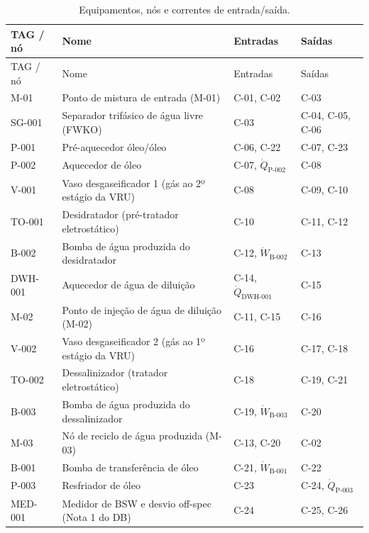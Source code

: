 \documentclass[11pt,a4paper]{article}
\numberwithin{equation}{section}
\numberwithin{table}{section}
\numberwithin{figure}{section}
\begin{document}
\begin{longtable}{lL{7cm}L{3cm}L{3.2cm}}
\caption{Equipamentos, nós e correntes de entrada/saída.}\label{tab:blocos}\\\toprule
TAG / nó & Nome & Entradas & Saídas\\\midrule\endfirsthead
\toprule TAG / nó & Nome & Entradas & Saídas\\\midrule\endhead

M-01 & Ponto de mistura de entrada (M-01) & C-01, C-02 & C-03\\
SG-001 & Separador trifásico de água livre (FWKO) & C-03 & C-04, C-05, C-06\\
P-001 & Pré-aquecedor óleo/óleo & C-06, C-22 & C-07, C-23\\
P-002 & Aquecedor de óleo & C-07, $\dot Q_{\mbox{P-002}}$ & C-08\\
V-001 & Vaso desgaseificador 1 (gás ao 2º estágio da VRU) & C-08 & C-09, C-10\\
TO-001 & Desidratador (pré-tratador eletrostático) & C-10 & C-11, C-12\\
B-002 & Bomba de água produzida do desidratador & C-12, $\dot W_{\mbox{B-002}}$ & C-13\\
DWH-001 & Aquecedor de água de diluição & C-14, $\dot Q_{\mbox{DWH-001}}$ & C-15\\
M-02 & Ponto de injeção de água de diluição (M-02) & C-11, C-15 & C-16\\
V-002 & Vaso desgaseificador 2 (gás ao 1º estágio da VRU) & C-16 & C-17, C-18\\
TO-002 & Dessalinizador (tratador eletrostático) & C-18 & C-19, C-21\\
B-003 & Bomba de água produzida do dessalinizador & C-19, $\dot W_{\mbox{B-003}}$ & C-20\\
M-03 & Nó de reciclo de água produzida (M-03) & C-13, C-20 & C-02\\
B-001 & Bomba de transferência de óleo & C-21, $\dot W_{\mbox{B-001}}$ & C-22\\
P-003 & Resfriador de óleo & C-23 & C-24, $\dot Q_{\mbox{P-003}}$\\
MED-001 & Medidor de BSW e desvio off-spec (Nota 1 do DB) & C-24 & C-25, C-26\\
\bottomrule\end{longtable}
\end{document}
